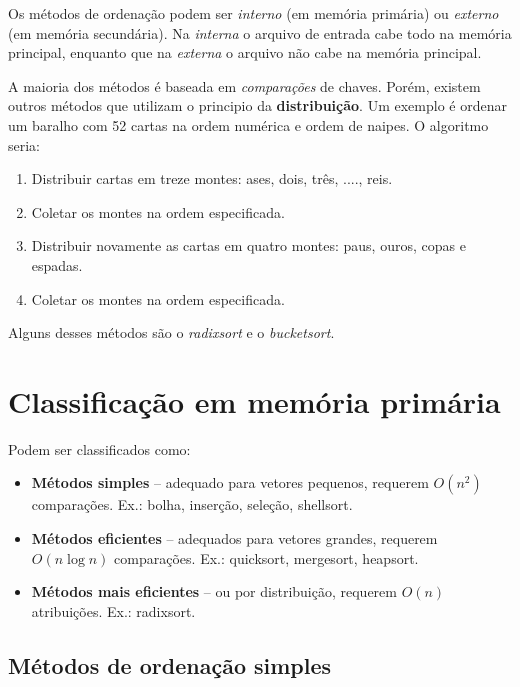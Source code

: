 Os métodos de ordenação podem ser \emph{interno} (em memória primária) ou
\emph{externo} (em memória secundária).  Na \emph{interna} o arquivo de entrada
cabe todo na memória principal, enquanto que na \emph{externa} o arquivo não
cabe na memória principal. 

A maioria dos métodos é baseada em \emph{comparações} de chaves.
Porém, existem outros métodos que utilizam o principio da {\bf distribuição}. 
Um exemplo é ordenar um baralho com 52 cartas na ordem numérica e ordem de naipes.
O algoritmo seria:
\begin{enumerate}
\item Distribuir cartas em treze montes: ases, dois, três, ...., reis.
\item Coletar os montes na ordem especificada.
\item Distribuir novamente as cartas em quatro montes: paus, ouros, copas e espadas.
\item Coletar os montes na ordem especificada.
\end{enumerate}
Alguns desses métodos são o \emph{radixsort} e o \emph{bucketsort}.

\chapter{Classificação em memória primária}

Podem ser classificados como:
\begin{itemize}
\item {\bf Métodos simples} -- adequado para vetores pequenos, requerem $O(n^2)$ comparações.
Ex.: bolha, inserção, seleção, shellsort.
\item {\bf Métodos eficientes} -- adequados para vetores grandes, requerem $O(n \log n)$ comparações.
Ex.: quicksort, mergesort, heapsort.
\item {\bf Métodos mais eficientes} -- ou por distribuição, requerem $O(n)$ atribuições. Ex.: radixsort.
\end{itemize}

\section{Métodos de ordenação simples}

